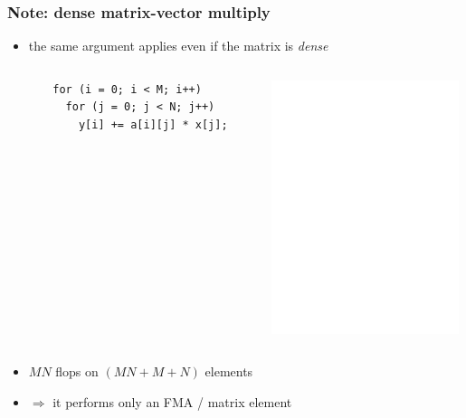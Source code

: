\documentclass[12pt,dvipdfmx]{beamer}
\newcommand{\ao}[1]{{\color{blue}#1}}
\begin{document}
\begin{frame}[fragile]
\frametitle{Note: \ao{dense} matrix-vector multiply}
\begin{itemize}
\item<1-> the same argument applies even if the matrix is \ao{\it dense}
  \begin{columns}
    \begin{column}{0.05\textwidth}
    \end{column}
    \begin{column}{0.5\textwidth}
\begin{lstlisting}
for (i = 0; i < M; i++)     
  for (j = 0; j < N; j++)     
    y[i] += a[i][j] * x[j];
\end{lstlisting}
  \end{column}
    \begin{column}{0.3\textwidth}
\includegraphics[width=\textwidth]{out/pdf/svg/dense_mv.pdf}
    \end{column}
  \end{columns}

\item<2-> $MN$ flops on $(MN + M + N)$ elements  
\item<3-> $\Rightarrow$ it performs only \ao{an FMA / matrix element}

\end{itemize}
\end{frame}
\end{document}
